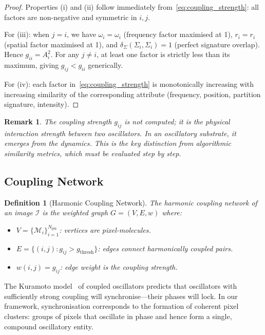 \documentclass[11pt,twocolumn,a4paper]{article}
\newtheorem{definition}[theorem]{Definition}
\newtheorem{remark}[theorem]{Remark}
\begin{document}
\begin{proof}
Properties (i) and (ii) follow immediately from~\eqref{eq:coupling_strength}: all factors are non-negative and symmetric in $i, j$.

For (iii): when $j = i$, we have $\omega_i = \omega_i$ (frequency factor maximised at 1), $r_i = r_i$ (spatial factor maximised at 1), and $\delta_\Sigma(\Sigma_i, \Sigma_i) = 1$ (perfect signature overlap). Hence $g_{ii} = A_i^2$. For any $j \neq i$, at least one factor is strictly less than its maximum, giving $g_{ij} < g_{ii}$ generically.

For (iv): each factor in~\eqref{eq:coupling_strength} is monotonically increasing with increasing similarity of the corresponding attribute (frequency, position, partition signature, intensity).
\end{proof}

\begin{remark}
The coupling strength $g_{ij}$ is \emph{not computed}; it is the physical interaction strength between two oscillators. In an oscillatory substrate, it emerges from the dynamics. This is the key distinction from algorithmic similarity metrics, which must be \emph{evaluated} step by step.
\end{remark}

\subsection{Coupling Network}

\begin{definition}[Harmonic Coupling Network]\label{def:coupling_network}
The harmonic coupling network of an image $\mathcal{I}$ is the weighted graph $G = (V, E, w)$ where:
\begin{itemize}[leftmargin=2em]
    \item $V = \{\mathcal{M}_i\}_{i=1}^{N_{\text{pix}}}$: vertices are pixel-molecules.
    \item $E = \{(i,j) : g_{ij} > g_{\text{thresh}}\}$: edges connect harmonically coupled pairs.
    \item $w(i,j) = g_{ij}$: edge weight is the coupling strength.
\end{itemize}
\end{definition}

The Kuramoto model~\citep{kuramoto1975, winfree1967} of coupled oscillators predicts that oscillators with sufficiently strong coupling will synchronise---their phases will lock. In our framework, synchronisation corresponds to the formation of coherent pixel clusters: groups of pixels that oscillate in phase and hence form a single, compound oscillatory entity.
\end{document}
